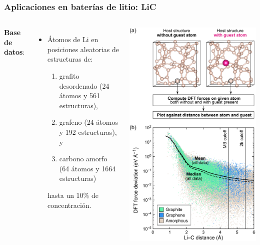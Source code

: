 \documentclass[aspectratio=169]{beamer}
\let\oldtextbf\textbf
\renewcommand{\textbf}[1]{\textcolor{nordblue}{\oldtextbf{#1}}}
\begin{document}
    \begin{frame}
        \frametitle{Aplicaciones en baterías de litio: LiC}
        
        \begin{columns}
            \textbf{Base de datos}:
            \begin{itemize}
                \item Átomos de Li en posiciones aleatorias de estructuras de:
                    \begin{enumerate}
                        \item grafito desordenado (24 átomos y 561 estructuras), 
                        \item grafeno (24 átomos y 192 estructuras), y
                        \item carbono amorfo (64 átomos y 1664 estructuras)
                    \end{enumerate}
                    hasta un 10\% de concentración.
            \end{itemize}

            \begin{center}
                \includegraphics[width=0.7\columnwidth]{LiC-fuerza_1_atomo_de_Li.png}
            \end{center}
        \end{columns}

    \end{frame}
    
\end{document}
